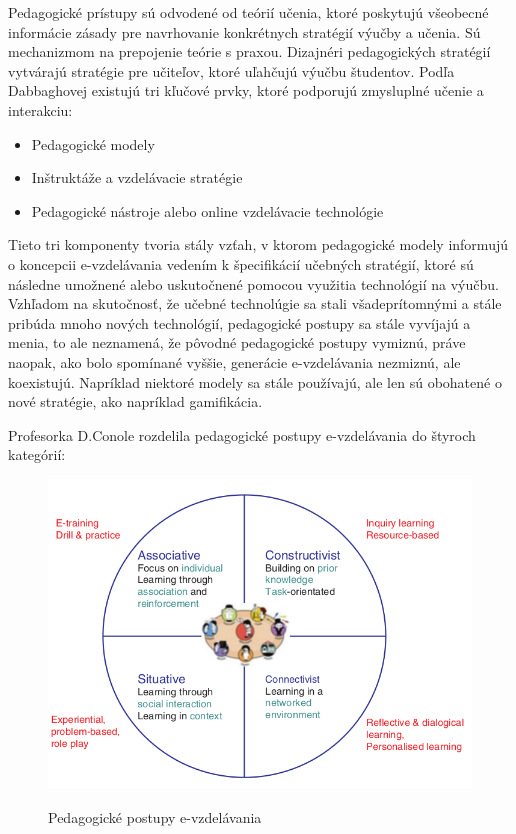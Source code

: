 \documentclass[10pt,slovak,a4paper]{article}
\begin{document}
	Pedagogické prístupy sú odvodené od teórií učenia, ktoré poskytujú všeobecné informácie
zásady pre navrhovanie konkrétnych stratégií výučby a učenia. Sú mechanizmom na prepojenie teórie s praxou. Dizajnéri pedagogických stratégií vytvárajú stratégie pre učiteľov, ktoré uľahčujú výučbu študentov. Podľa Dabbaghovej existujú tri kľučové prvky, ktoré podporujú zmysluplné učenie a interakciu\cite{dabbagh}:
	\begin{itemize}
		\item Pedagogické modely
		\item Inštruktáže a vzdelávacie stratégie
		\item Pedagogické nástroje alebo online vzdelávacie technológie
	\end{itemize}
	Tieto tri komponenty tvoria stály vzťah, v ktorom pedagogické modely informujú o koncepcii e-vzdelávania vedením k špecifikácií učebných stratégií, ktoré sú následne umožnené alebo uskutočnené pomocou využitia technológií na výučbu. Vzhľadom na skutočnosť, že učebné technolúgie sa stali všadeprítomnými a stále pribúda mnoho nových technológií, pedagogické postupy sa stále vyvíjajú a menia, to ale neznamená, že pôvodné pedagogické postupy vymiznú, práve naopak, ako bolo spomínané vyššie, generácie e-vzdelávania nezmiznú, ale koexistujú. Napríklad niektoré modely sa stále používajú, ale len sú obohatené o nové stratégie, ako napríklad gamifikácia. 
	\cite{main}

	Profesorka D.Conole rozdelila pedagogické postupy e-vzdelávania do štyroch kategórií\cite{conoleBook}:

	\begin{figure}
		\centering
		\includegraphics[width = \textwidth]{Obrazky/Pedagogicke postupy.png}
		\caption{Pedagogické postupy e-vzdelávania}
		\label{obrazok-pedagPostupy}
		\cite{pedagPostupy}
	\end{figure}
	
\end{document}
